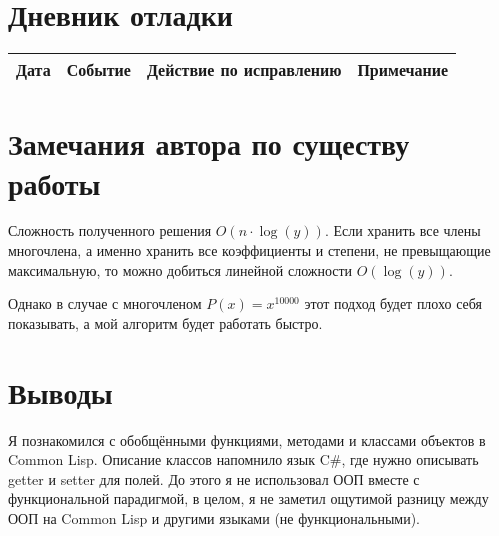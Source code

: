 \documentclass[12pt]{article}
\begin{document}
\pagebreak
\section{Дневник отладки}
\begin{tabular}{|p{50pt}|p{140pt}|p{140pt}|p{80pt}|}
\hline
Дата & Событие & Действие по исправлению & Примечание \\
\hline
\end{tabular}

\section{Замечания автора по существу работы}

Сложность полученного решения $O(n \cdot \log(y))$. Если хранить все члены многочлена, а именно хранить все коэффициенты и степени, не превыщающие максимальную, то можно добиться линейной сложности $O(\log(y))$.

Однако в случае с многочленом $P(x) = x^{10000}$ этот подход будет плохо себя показывать, а мой алгоритм будет работать быстро.

\section{Выводы}
Я познакомился с обобщёнными функциями, методами и классами объектов в Common Lisp. Описание классов напомнило язык C\#, где нужно описывать getter и setter для полей. До этого я не использовал ООП вместе с функциональной парадигмой, в целом, я не заметил ощутимой разницу между ООП на Common Lisp и другими языками (не функциональными).
\end{document}

